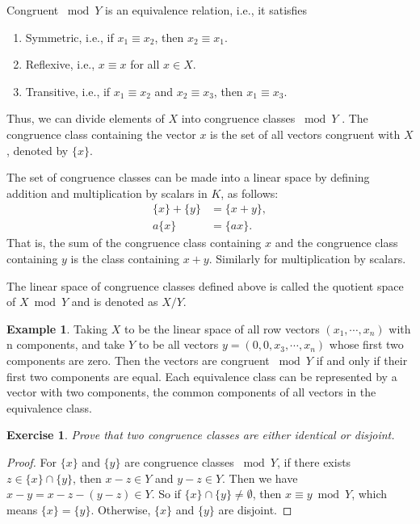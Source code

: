 \documentclass[10pt]{book}
\newtheorem{exercise}{Exercise}[section]
\theoremstyle{definition}
\newtheorem{example}{Example}[chapter]
\numberwithin{equation}{chapter}
\begin{document}
Congruent $\bmod Y$ is an equivalence relation, i.e., it satisfies
\begin{enumerate}[label=(\arabic*)]
    \item Symmetric, i.e., if $x_1\equiv x_2$, then $x_2\equiv x_1$.
    \item Reflexive, i.e., $x\equiv x$ for all $x\in X$.
    \item Transitive, i.e., if $x_1\equiv x_2$ and $x_2\equiv x_3$, then $x_1\equiv x_3$.
\end{enumerate}
Thus, we can divide elements of $X$ into congruence classes $\bmod Y$ . The congruence class containing the vector $x$ is the set of all vectors congruent with $X$, denoted by $\{x\}$.

The set of congruence classes can be made into a linear space by defining addition and multiplication by scalars in $K$, as follows:
\begin{align*}
    \{x\} + \{y\}& = \{x+y\},\\
    a\{x\} &= \{ax\}.
\end{align*}
That is, the sum of the congruence class containing $x$ and the congruence class containing $y$ is the class containing $x + y$. Similarly for multiplication by scalars.

The linear space of congruence classes defined above is called the quotient space of $X \bmod Y$ and is denoted as $X/Y$. 

\medskip

\begin{example}
Taking $X$ to be the linear space of all row vectors $(x_1,\cdots, x_n)$ with n components, and take $Y$ to be all vectors $y = (0, 0, x_3,\cdots, x_n) $ whose first two components are zero. Then the vectors are congruent $\bmod Y$ if and only if their first two components are equal. Each equivalence class can be represented by a vector with two components, the common components of all vectors in the equivalence class. 
\end{example}

\medskip

\begin{exercise}
Prove that two congruence classes are either identical or disjoint. 
\end{exercise}
\begin{proof}
For $\{x\}$ and $\{y\}$ are congruence classes $\bmod Y$, if there exists $z\in \{x\}\cap \{y\}$, then $x-z \in Y$ and $y-z\in Y$. Then we have $x-y = x-z-(y-z) \in Y$. So if $\{x\}\cap \{y\}\neq \emptyset$, then $x\equiv y \bmod Y$, which means $\{x\} = \{y\}$. Otherwise, $\{x\}$ and $\{y\}$ are disjoint.
\end{proof}
\end{document}

